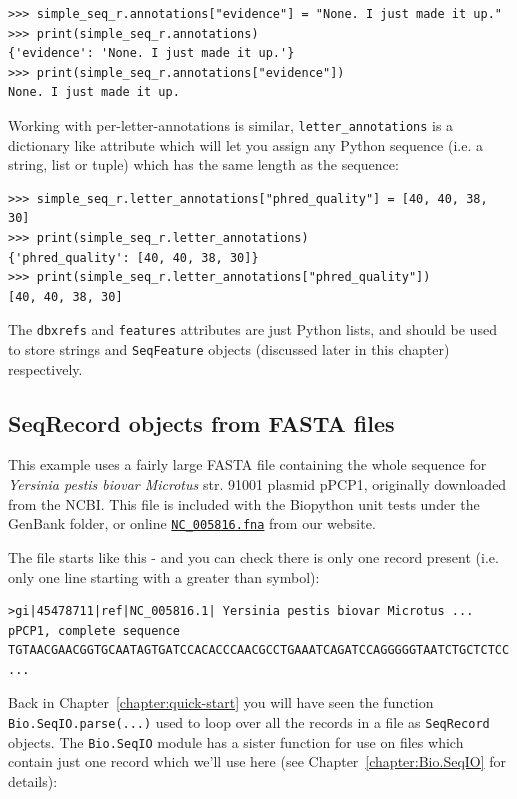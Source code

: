 \documentclass{report}
\begin{document}
\begin{verbatim}
>>> simple_seq_r.annotations["evidence"] = "None. I just made it up."
>>> print(simple_seq_r.annotations)
{'evidence': 'None. I just made it up.'}
>>> print(simple_seq_r.annotations["evidence"])
None. I just made it up.
\end{verbatim}

Working with per-letter-annotations is similar, \verb|letter_annotations| is a
dictionary like attribute which will let you assign any Python sequence (i.e.
a string, list or tuple) which has the same length as the sequence:

\begin{verbatim}
>>> simple_seq_r.letter_annotations["phred_quality"] = [40, 40, 38, 30]
>>> print(simple_seq_r.letter_annotations)
{'phred_quality': [40, 40, 38, 30]}
>>> print(simple_seq_r.letter_annotations["phred_quality"])
[40, 40, 38, 30]
\end{verbatim}

The \verb|dbxrefs| and \verb|features| attributes are just Python lists, and
should be used to store strings and \verb|SeqFeature| objects (discussed later
in this chapter) respectively.


\subsection{SeqRecord objects from FASTA files}

This example uses a fairly large FASTA file containing the whole sequence for \textit{Yersinia pestis biovar Microtus} str. 91001 plasmid pPCP1, originally downloaded from the NCBI.  This file is included with the Biopython unit tests under the GenBank folder, or online \href{http://biopython.org/SRC/biopython/Tests/GenBank/NC_005816.fna}{\texttt{NC\_005816.fna}} from our website.

The file starts like this - and you can check there is only one record present (i.e. only one line starting with a greater than symbol):

\begin{verbatim}
>gi|45478711|ref|NC_005816.1| Yersinia pestis biovar Microtus ... pPCP1, complete sequence
TGTAACGAACGGTGCAATAGTGATCCACACCCAACGCCTGAAATCAGATCCAGGGGGTAATCTGCTCTCC
...
\end{verbatim}

Back in Chapter~\ref{chapter:quick-start} you will have seen the function \verb|Bio.SeqIO.parse(...)|
used to loop over all the records in a file as \verb|SeqRecord| objects. The \verb|Bio.SeqIO| module
has a sister function for use on files which contain just one record which we'll use here (see Chapter~\ref{chapter:Bio.SeqIO} for details):
\end{document}
